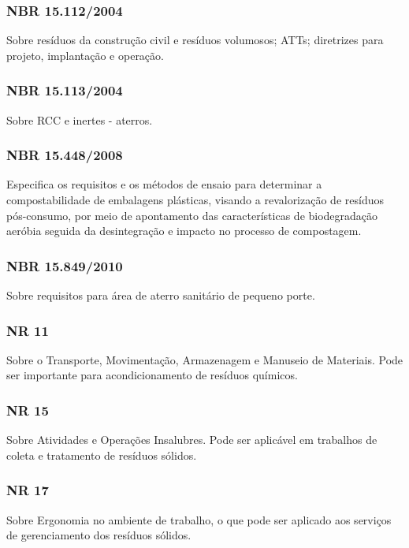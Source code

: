 \begin{subapend}
\begin{subsubapend}
		\subsubsection{NBR 15.112/2004}
		Sobre resíduos da construção civil e resíduos volumosos; ATTs; diretrizes para projeto, implantação e operação.
		\subsubsection{NBR 15.113/2004}
		Sobre RCC e inertes - aterros.
		\subsubsection{NBR 15.448/2008}
		Especifica os requisitos e os métodos de ensaio para determinar a compostabilidade de embalagens plásticas, visando a revalorização de resíduos pós-consumo, por meio de apontamento das características de biodegradação aeróbia seguida da desintegração e impacto no processo de compostagem.
		\subsubsection{NBR 15.849/2010}
		Sobre requisitos para área de aterro sanitário de pequeno porte. 
		\subsubsection{NR 11}
		Sobre o Transporte, Movimentação, Armazenagem e Manuseio de Materiais. Pode ser importante para acondicionamento de resíduos químicos.
		\subsubsection{NR 15}
		Sobre Atividades e Operações Insalubres. Pode ser aplicável em trabalhos de coleta e tratamento de resíduos sólidos.
		\subsubsection{NR 17}
		Sobre Ergonomia no ambiente de trabalho, o que pode ser aplicado aos serviços de gerenciamento dos resíduos sólidos.
	\end{subsubapend}
\end{subapend}

